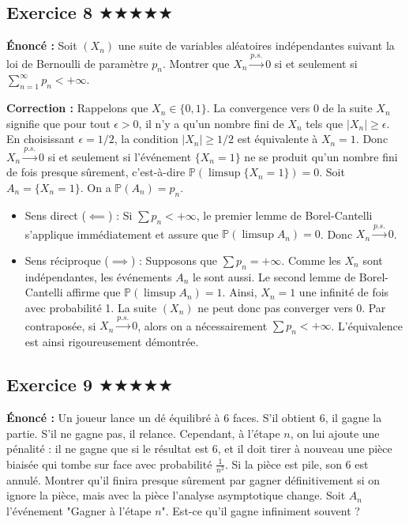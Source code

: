 \documentclass[11pt,a4paper]{article}
\begin{document}
\subsection*{Exercice 8 \quad $\bigstar\bigstar\bigstar\bigstar\bigstar$}


\textbf{Énoncé :}
Soit $(X_n)$ une suite de variables aléatoires indépendantes suivant la loi de Bernoulli de paramètre $p_n$.
Montrer que $X_n \xrightarrow{p.s.} 0$ si et seulement si $\sum_{n=1}^\infty p_n < +\infty$.

\textbf{Correction :}
Rappelons que $X_n \in \{0, 1\}$.
La convergence vers 0 de la suite $X_n$ signifie que pour tout $\epsilon > 0$, il n'y a qu'un nombre fini de $X_n$ tels que $|X_n| \ge \epsilon$.
En choisissant $\epsilon = 1/2$, la condition $|X_n| \ge 1/2$ est équivalente à $X_n = 1$.
Donc $X_n \xrightarrow{p.s.} 0$ si et seulement si l'événement $\{X_n = 1\}$ ne se produit qu'un nombre fini de fois presque sûrement, c'est-à-dire $\mathbb{P}(\limsup \{X_n = 1\}) = 0$.
Soit $A_n = \{X_n = 1\}$. On a $\mathbb{P}(A_n) = p_n$.
\begin{itemize}
\item Sens direct ($\impliedby$) : Si $\sum p_n < +\infty$, le premier lemme de Borel-Cantelli s'applique immédiatement et assure que $\mathbb{P}(\limsup A_n) = 0$. Donc $X_n \xrightarrow{p.s.} 0$.
\item Sens réciproque ($\implies$) : Supposons que $\sum p_n = +\infty$. Comme les $X_n$ sont indépendantes, les événements $A_n$ le sont aussi. Le second lemme de Borel-Cantelli affirme que $\mathbb{P}(\limsup A_n) = 1$. Ainsi, $X_n = 1$ une infinité de fois avec probabilité 1. La suite $(X_n)$ ne peut donc pas converger vers 0. Par contraposée, si $X_n \xrightarrow{p.s.} 0$, alors on a nécessairement $\sum p_n < +\infty$.
L'équivalence est ainsi rigoureusement démontrée.
\end{itemize}


\subsection*{Exercice 9 \quad $\bigstar\bigstar\bigstar\bigstar\bigstar$}


\textbf{Énoncé :}
Un joueur lance un dé équilibré à 6 faces. S'il obtient 6, il gagne la partie. S'il ne gagne pas, il relance. Cependant, à l'étape $n$, on lui ajoute une pénalité : il ne gagne que si le résultat est 6, et il doit tirer à nouveau une pièce biaisée qui tombe sur face avec probabilité $\frac{1}{n^2}$. Si la pièce est pile, son 6 est annulé.
Montrer qu'il finira presque sûrement par gagner définitivement si on ignore la pièce, mais avec la pièce l'analyse asymptotique change. Soit $A_n$ l'événement "Gagner à l'étape $n$". Est-ce qu'il gagne infiniment souvent ?
\end{document}
